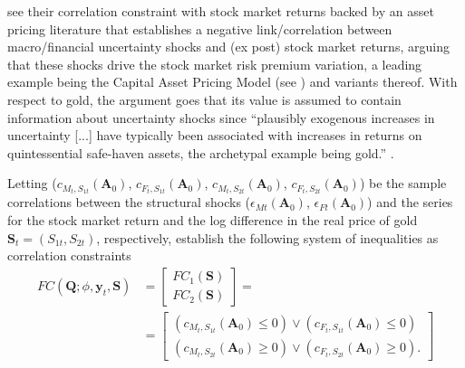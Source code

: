 \documentclass[a4paper,11pt,listof=nochaptergap,oneside,pointednumbers,bibtotoc,bigheadings,liststotoc,hidelinks]{scrbook}
\theoremstyle{mysatz}
\theoremstyle{mydefinition}
\theoremstyle{mytheorem}
\theoremstyle{mybemerkung}
\newcommand{\vect}[1]{\boldsymbol{\mathbf{#1}}}
\begin{document}
\citet{ludvigsonetal:19} see their correlation constraint with stock market returns backed by an asset pricing literature that establishes a negative link/correlation between macro/financial uncertainty shocks and (ex post) stock market returns, arguing that these shocks drive the stock market risk premium variation, a leading example being the Capital Asset Pricing Model (see \citealp{sharpe:64, lintner:65}) and variants thereof. With respect to gold, the argument goes that its value is assumed to contain information about uncertainty shocks since ``plausibly exogenous increases in uncertainty [...] have typically been associated with increases in returns on quintessential safe-haven assets, the archetypal example being gold.'' \citep[p. 10]{ludvigsonetal:19}.

Letting ($c_{M_{t}, S_{1t}}(\vect{A}_0)$, $c_{F_{t}, S_{1t}}(\vect{A}_0)$, $c_{M_{t}, S_{2t}}(\vect{A}_0)$, $c_{F_{t}, S_{2t}}(\vect{A}_0)$) be the sample correlations between the structural shocks ($\epsilon_{Mt}(\vect{A}_0)$, $\epsilon_{Ft}(\vect{A}_0)$) and the series for the stock market return and the log difference in the real price of gold $\vect{S}_t =  (S_{1t}, S_{2t})$, respectively, \citet{ludvigsonetal:19} establish the following system of inequalities as correlation constraints
\begin{equation} \label{eq:svar_ludvi13}
\begin{split}
	FC(\vect{Q}; \phi, \vect{y}_t, \vect{S}) & = \begin{bmatrix}
	FC_1(\vect{S})\\
	 FC_2(\vect{S})
	\end{bmatrix} = \\
	& = \begin{bmatrix}
			(c_{M_{t}, S_{1t}}(\vect{A}_0) \leq 0)  \lor  (c_{F_{t}, S_{1t}}(\vect{A}_0) \leq 0) \\
			(c_{M_{t}, S_{2t}}(\vect{A}_0) \geq 0)  \lor  (c_{F_{t}, S_{2t}}(\vect{A}_0) \geq 0).
	\end{bmatrix} 
\end{split}								
\end{equation}
\end{document}
